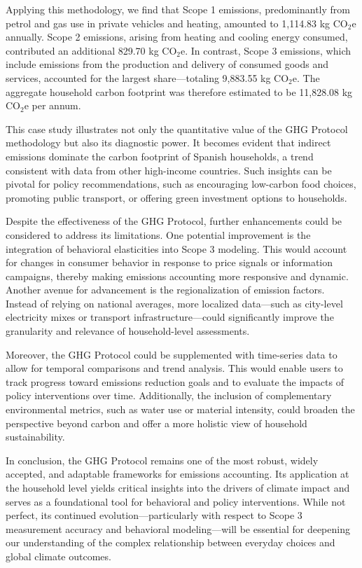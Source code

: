 \documentclass[12pt,a4paper]{article}%
\begin{document}
Applying this methodology, we find that Scope 1 emissions, predominantly from petrol and gas use in private vehicles and heating, amounted to 1,114.83 kg CO$_2$e annually. Scope 2 emissions, arising from heating and cooling energy consumed, contributed an additional 829.70 kg CO$_2$e. In contrast, Scope 3 emissions, which include emissions from the production and delivery of consumed goods and services, accounted for the largest share—totaling 9,883.55 kg CO$_2$e. The aggregate household carbon footprint was therefore estimated to be 11,828.08 kg CO$_2$e per annum.

This case study illustrates not only the quantitative value of the GHG Protocol methodology but also its diagnostic power. It becomes evident that indirect emissions dominate the carbon footprint of Spanish households, a trend consistent with data from other high-income countries. Such insights can be pivotal for policy recommendations, such as encouraging low-carbon food choices, promoting public transport, or offering green investment options to households.

Despite the effectiveness of the GHG Protocol, further enhancements could be considered to address its limitations. One potential improvement is the integration of behavioral elasticities into Scope 3 modeling. This would account for changes in consumer behavior in response to price signals or information campaigns, thereby making emissions accounting more responsive and dynamic. Another avenue for advancement is the regionalization of emission factors. Instead of relying on national averages, more localized data—such as city-level electricity mixes or transport infrastructure—could significantly improve the granularity and relevance of household-level assessments.

Moreover, the GHG Protocol could be supplemented with time-series data to allow for temporal comparisons and trend analysis. This would enable users to track progress toward emissions reduction goals and to evaluate the impacts of policy interventions over time. Additionally, the inclusion of complementary environmental metrics, such as water use or material intensity, could broaden the perspective beyond carbon and offer a more holistic view of household sustainability.

In conclusion, the GHG Protocol remains one of the most robust, widely accepted, and adaptable frameworks for emissions accounting. Its application at the household level yields critical insights into the drivers of climate impact and serves as a foundational tool for behavioral and policy interventions. While not perfect, its continued evolution—particularly with respect to Scope 3 measurement accuracy and behavioral modeling—will be essential for deepening our understanding of the complex relationship between everyday choices and global climate outcomes.
\end{document}
